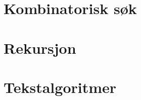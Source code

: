 \documentclass[11pt,a4paper]{article}
\begin{document}
\section{Kombinatorisk søk}
\section{Rekursjon}

\section{Tekstalgoritmer}

















\newpage

\listoftables
\listoffigures
\end{document}
